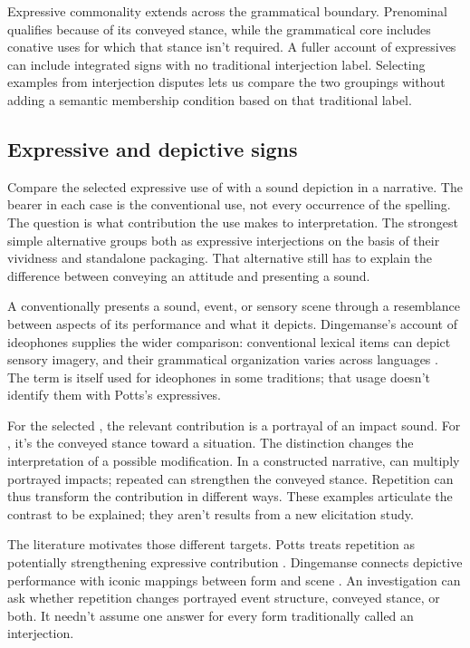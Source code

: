 \documentclass[12pt]{article}
\begin{document}
Expressive commonality extends across the grammatical boundary. Prenominal
 qualifies because of its conveyed stance, while the
grammatical core includes conative uses for which that stance isn't
required. A fuller account of expressives can include integrated signs
with no traditional interjection label. Selecting examples from interjection
disputes lets us compare the two groupings without adding a semantic
membership condition based on that traditional label.

\subsection{Expressive and depictive signs}\label{sec:expressive-depictive}

Compare the selected expressive use of  with a sound depiction
 in a narrative. The bearer in each case is the conventional
use, not every occurrence of the spelling. The question is what contribution
the use makes to interpretation. The strongest simple alternative groups
both as expressive interjections on the basis of their vividness and
standalone packaging. That alternative still has to explain the difference
between conveying an attitude and presenting a sound.

A  conventionally presents a sound, event, or sensory
scene through a resemblance between aspects of its performance and what
it depicts. Dingemanse's account of ideophones supplies the wider comparison:
conventional lexical items can depict sensory imagery, and their grammatical
organization varies across languages \citep[2--3]{dingemanse2018}.
The term  is itself used for ideophones in some traditions;
that usage doesn't identify them with Potts's expressives.

For the selected , the relevant contribution is a portrayal
of an impact sound. For , it's the conveyed stance toward
a situation. The distinction changes the interpretation of a possible
modification. In a constructed narrative,  can
multiply portrayed impacts; repeated  can strengthen the
conveyed stance. Repetition can thus transform the contribution in
different ways. These examples articulate the contrast to be explained;
they aren't results from a new elicitation study.

The literature motivates those different targets. Potts treats repetition
as potentially strengthening expressive contribution \citep[181--182]{potts2007}.
Dingemanse connects depictive performance with iconic mappings between
form and scene \citep[10--11]{dingemanse2018}. An investigation can
ask whether repetition changes portrayed event structure, conveyed stance,
or both. It needn't assume one answer for every form traditionally
called an interjection.
\end{document}
